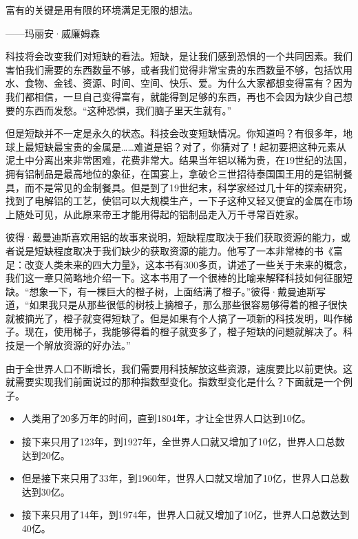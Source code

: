 \begin{BookQuote}
富有的关键是用有限的环境满足无限的想法。

\hfill ——玛丽安·威廉姆森
\end{BookQuote}

科技将会改变我们对短缺的看法。短缺，是让我们感到恐惧的一个共同因素。我们害怕我们需要的东西数量不够，或者我们觉得非常宝贵的东西数量不够，包括饮用水、食物、金钱、资源、时间、空间、快乐、爱。为什么大家都想变得富有？因为我们都相信，一旦自己变得富有，就能得到足够的东西，再也不会因为缺少自己想要的东西而发愁。“这种恐惧，我们脑子里天生就有。”

但是短缺并不一定是永久的状态。科技会改变短缺情况。你知道吗？有很多年，地球上最短缺最宝贵的金属是……难道是铝？对了，你猜对了！起初要把这种元素从泥土中分离出来非常困难，花费非常大。结果当年铝以稀为贵，在19世纪的法国，拥有铝制品是最高地位的象征，在国宴上，拿破仑三世招待泰国国王用的是铝制餐具，而不是常见的金制餐具。但是到了19世纪末，科学家经过几十年的探索研究，找到了电解铝的工艺，使铝可以大规模生产，一下子这种又轻又便宜的金属在市场上随处可见，从此原来帝王才能用得起的铝制品走入万千寻常百姓家。

彼得·戴曼迪斯喜欢用铝的故事来说明，短缺程度取决于我们获取资源的能力，或者说是短缺程度取决于我们缺少的获取资源的能力。他写了一本非常棒的书《富足：改变人类未来的四大力量》，这本书有300多页，讲述了一些关于未来的概念，我们这一章只简略地介绍一下。这本书用了一个很棒的比喻来解释科技如何征服短缺。“想象一下，有一棵巨大的橙子树，上面结满了橙子。”彼得·戴曼迪斯写道，“如果我只是从那些很低的树枝上摘橙子，那么那些很容易够得着的橙子很快就被摘光了，橙子就变得短缺了。但是如果有个人搞了一项新的科技发明，叫作梯子。现在，使用梯子，我能够得着的橙子就变多了，橙子短缺的问题就解决了。科技是一个解放资源的好办法。”

由于全世界人口不断增长，我们需要用科技解放这些资源，速度要比以前更快。这就需要实现我们前面说过的那种指数型变化。指数型变化是什么？下面就是一个例子。

\begin{itemize}
\item 人类用了20多万年的时间，直到1804年，才让全世界人口达到10亿。
\item 接下来只用了123年，到1927年，全世界人口就又增加了10亿，世界人口总数达到20亿。
\item 但是接下来只用了33年，到1960年，世界人口就又增加了10亿，世界人口总数达到30亿。
\item 接下来只用了14年，到1974年，世界人口就又增加了10亿，世界人口总数达到40亿。
\end{itemize}

